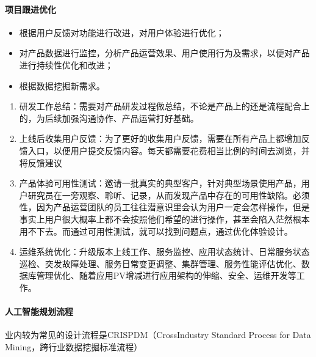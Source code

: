 \documentclass[letterpaper,10pt,english]{sphinxmanual}
\begin{document}
\paragraph{项目跟进优化}
\label{\detokenize{chapter_project/process:id12}}\begin{itemize}
\item {} 
根据用户反馈对功能进行改进，对用户体验进行优化；

\item {} 
对产品数据进行监控，分析产品运营效果、用户使用行为及需求，以便对产品进行持续性优化和改进；

\item {} 
根据数据挖掘新需求。

\end{itemize}
\begin{enumerate}
%
\item {} 
研发工作总结：需要对产品研发过程做总结，不论是产品上的还是流程配合上的，为后续加强沟通协作、产品运营打好基础。

\item {} 
上线后收集用户反馈：为了更好的收集用户反馈，需要在所有产品上都增加反馈入口，以便用户提交反馈内容。每天都需要花费相当比例的时间去浏览，并将反馈建议

\item {} 
产品体验可用性测试：邀请一批真实的典型客户，针对典型场景使用产品，用户研究员在一旁观察、聆听、记录，从而发现产品中存在的可用性缺陷。必须性，因为产品运营团队的员工往往潜意识里会认为用户一定会怎样操作，但是事实上用户很大概率上都不会按照他们希望的进行操作，甚至会陷入茫然根本用不下去。而通过可用性测试，就可以找到问题点，通过优化体验设计。

\item {} 
运维系统优化：升级版本上线工作、服务监控、应用状态统计、日常服务状态巡检、突发故障处理、服务日常变更调整、集群管理、服务性能评估优化、数据库管理优化、随着应用PV增减进行应用架构的伸缩、安全、运维开发等工作。

\end{enumerate}


\paragraph{人工智能规划流程}
\label{\detokenize{chapter_project/process:id13}}
业内较为常见的设计流程是CRISP\sphinxhyphen{}DM（Cross\sphinxhyphen{}Industry Standard Process for
Data Mining，跨行业数据挖掘标准流程）
\end{document}

